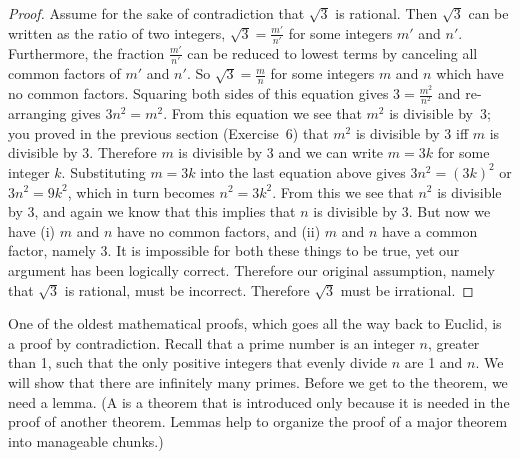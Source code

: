 \begin{proof}
Assume for the sake of contradiction that $\sqrt{3}$ is rational.
Then $\sqrt{3}$ can be written as the ratio of two integers,
$\sqrt{3} = \frac{m'}{n'}$ for some integers $m'$ and $n'$.
Furthermore, the fraction $\frac{m'}{n'}$ can be reduced to lowest
terms by canceling all common factors of $m'$ and $n'$.  So
$\sqrt{3} = \frac{m}{n}$ for some integers $m$ and $n$ which have no
common factors.  Squaring both sides of this equation gives
$3 = \frac{m^2}{n^2}$ and re-arranging gives $3n^2 = m^2.$  From
this equation we see that $m^2$ is divisible by~3; you proved in
the previous section (Exercise~6) that $m^2$ is divisible by 3 iff $m$ is
divisible by 3.  Therefore $m$ is divisible by 3 and we can write
$m=3k$ for some integer $k$.  Substituting $m=3k$ into the last equation
above gives $3n^2 = (3k)^2$ or $3n^2 = 9k^2$, which in turn becomes
$n^2 = 3k^2.$  From this we see that $n^2$ is divisible by 3, and
again we know that this implies that $n$ is divisible by 3.  But
now we have (i) $m$ and $n$ have no common factors, and (ii) $m$ and
$n$ have a common factor, namely 3.  It is impossible for both these
things to be true, yet our argument has been logically correct.  
Therefore our original assumption, namely that $\sqrt{3}$ is rational,
must be incorrect.  Therefore $\sqrt{3}$ must be irrational.
\end{proof}

\medbreak

One of the oldest mathematical proofs, which goes all the
way back to Euclid, is a proof by contradiction.
Recall that a prime number is an integer $n$, greater than 1, 
such that the only positive integers that evenly divide $n$ are
1 and $n$.  We will show that there are infinitely many primes.
Before we get to the theorem, we need a lemma.
(A  is a theorem that is introduced only because it
is needed in the proof of another theorem.  Lemmas help to
organize the proof of a major theorem into manageable chunks.)

